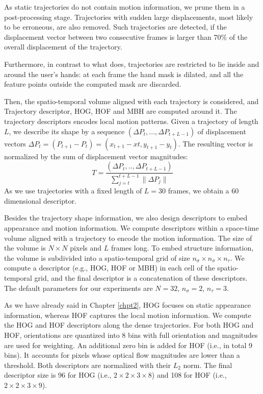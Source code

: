 As static trajectories do not contain motion information, we prune them in a post-processing stage.
Trajectories with sudden large displacements, most likely to be erroneous, are also removed. Such trajectories
are detected, if the displacement vector between two consecutive frames is larger than 70\% of the
overall displacement of the trajectory.

Furthermore, in contrast to what \cite{wang:2011:inria-00583818:1} does, trajectories are restricted to lie inside and around the user's hands: at each frame the hand mask is dilated, and all the feature points outside the computed mask are discarded.


Then, the spatio-temporal volume aligned with each trajectory is considered, and Trajectory descriptor, HOG, HOF and MBH are computed around it. The trajectory descriptors encodes local motion patterns. Given a trajectory of length $L$, we describe its
shape by a sequence $(\Delta P_t, ..., \Delta P_{t+L-1})$ of displacement vectors $\Delta P_t = (P_{t+1}- P_t) = (x_{t+1} -
xt, y_{t+1}- y_t)$. The resulting vector is normalized by the sum of displacement vector magnitudes:
\begin{equation}
T = \frac{(\Delta P_t, .., \Delta P_{t+L-1})}{\sum_{j=t}^{t+L-1} \| \Delta P_j \|}
\end{equation}
As we use trajectories with a fixed length of $L = 30$ frames, we obtain a 60 dimensional descriptor.

Besides the trajectory shape information, we also design descriptors to embed appearance and motion
information. We compute
descriptors within a space-time volume aligned with a trajectory to encode the motion information. The size of the volume is $N \times N$ pixels and $L$ frames long. To embed structure information, the volume is subdivided into a spatio-temporal grid of size $n_\sigma \times n_\sigma \times n_\tau$. We compute a descriptor (e.g.,
HOG, HOF or MBH) in each cell of the spatio-temporal grid, and the final descriptor is a concatenation
of these descriptors. The default parameters for our experiments are $N = 32$, $n_\sigma = 2$, $n_\tau = 3$.

As we have already said in Chapter \ref{chpt2}, HOG focuses on static appearance information, whereas HOF captures the
local motion information. We compute the HOG and HOF descriptors along the dense trajectories. For both HOG and HOF,
orientations are quantized into 8 bins with full orientation and magnitudes are used for weighting. An
additional zero bin is added for HOF (i.e., in total 9 bins). It accounts for pixels whose optical flow
magnitudes are lower than a threshold. Both descriptors are normalized with their $L_2$ norm. The final
descriptor size is 96 for HOG (i.e., $2\times 2\times 3\times 8$) and 108 for HOF (i.e., $2\times 2 \times 3 \times 9$).

